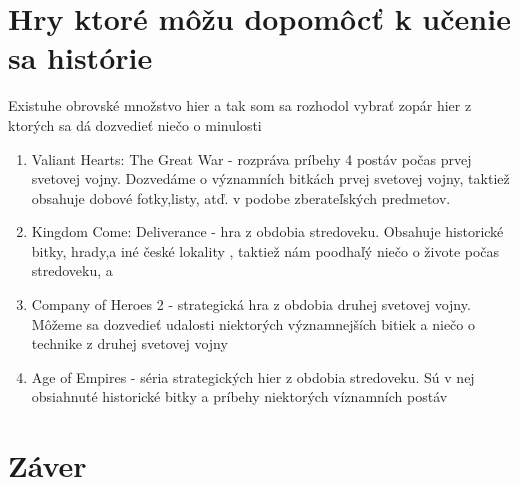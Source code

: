\documentclass[10pt,twoside,slovak,a4paper]{article}
\begin{document}
\section{Hry ktoré môžu dopomôcť k učenie sa histórie} \label{moj typ}
Existuhe obrovské množstvo hier a tak som sa rozhodol vybrať zopár hier z ktorých sa dá dozvedieť niečo o minulosti
\begin{enumerate}
\item Valiant Hearts: The Great War - rozpráva príbehy 4 postáv počas prvej svetovej vojny. Dozvedáme o významních bitkách prvej svetovej vojny, taktiež obsahuje dobové fotky,listy, atď. v podobe zberateľských predmetov.
\item Kingdom Come: Deliverance - hra z obdobia stredoveku. Obsahuje historické bitky, hrady,a iné české lokality , taktiež nám poodhaľý niečo o živote počas stredoveku, a  
\item Company of Heroes 2 - strategická hra z obdobia druhej svetovej vojny. Môžeme sa dozvedieť udalosti niektorých významnejších bitiek a niečo o technike z druhej svetovej vojny
\item Age of Empires - séria strategických hier z obdobia stredoveku. Sú v nej obsiahnuté historické bitky a príbehy niektorých víznamních postáv

\end{enumerate}


\section{Záver} \label{zaver} 





\end{document}
